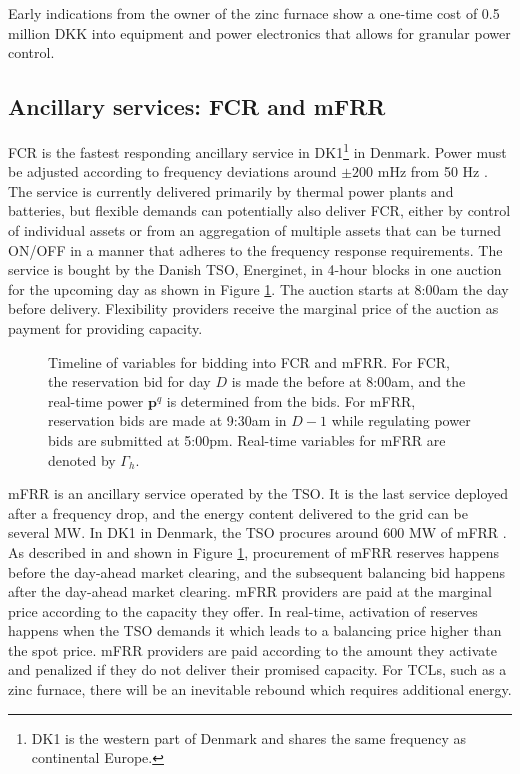 \documentclass[sigconf]{acmart}
\begin{document}
Early indications from the owner of the zinc furnace show a one-time cost of 0.5 million DKK into equipment and power electronics that allows for granular power control.

\subsection{Ancillary services: FCR and mFRR}

FCR is the fastest responding ancillary service in DK1\footnote{DK1 is the western part of Denmark and shares the same frequency as continental Europe.} in Denmark. Power must be adjusted according to frequency deviations around $\pm 200$ mHz from 50 Hz \cite{energinet:prequalification}. The service is currently delivered primarily by thermal power plants and batteries, but flexible demands can potentially also deliver FCR, either by control of individual assets or from an aggregation of multiple assets that can be turned ON/OFF in a manner that adheres to the frequency response requirements. The service is bought by the Danish TSO, Energinet, in 4-hour blocks in one auction for the upcoming day as shown in Figure \ref{fig:timeline}. The auction starts at 8:00am the day before delivery. Flexibility providers receive the marginal price of the auction as payment for providing capacity.

\begin{figure}
    \begin{adjustbox}{width=\columnwidth}
        
    \end{adjustbox}
    \caption{Timeline of variables for bidding into FCR and mFRR. For FCR, the reservation bid for day $D$ is made the before at 8:00am, and the real-time power $\bm{p}^{q}$ is determined from the bids. For mFRR, reservation bids are made at 9:30am in $D-1$ while regulating power bids are submitted at 5:00pm. Real-time variables for mFRR are denoted by $\Gamma_{h}$.}
    \label{fig:timeline}
\end{figure}



mFRR is an ancillary service operated by the TSO. It is the last service deployed after a frequency drop, and the energy content delivered to the grid can be several MW. In DK1 in Denmark, the TSO procures around 600 MW of mFRR \cite{energinet:scenario_report_2022}.
%
As described in \cite{gade2023load} and shown in Figure \ref{fig:timeline}, procurement of mFRR reserves happens before the day-ahead market clearing, and the subsequent balancing bid happens after the day-ahead market clearing. mFRR providers are paid at the marginal price according to the capacity they offer. In real-time, activation of reserves happens when the TSO demands it which leads to a balancing price higher than the spot price. mFRR providers are paid according to the amount they activate and penalized if they do not deliver their promised capacity. For TCLs, such as a zinc furnace, there will be an inevitable rebound which requires additional energy.
\end{document}
